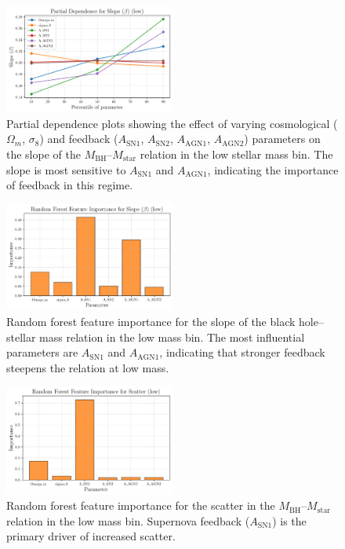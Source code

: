 \documentclass[twocolumn]{aastex631}
\begin{document}
\begin{figure}[ht!]
    \centering
    \includegraphics[width=0.5\textwidth]{plots/pdp_Slope_beta_low_29_20250423_182536.png}
    \caption{Partial dependence plots showing the effect of varying cosmological ($\Omega_m$, $\sigma_8$) and feedback ($A_\mathrm{SN1}$, $A_\mathrm{SN2}$, $A_\mathrm{AGN1}$, $A_\mathrm{AGN2}$) parameters on the slope of the $M_\mathrm{BH}$--$M_\mathrm{star}$ relation in the low stellar mass bin. The slope is most sensitive to $A_\mathrm{SN1}$ and $A_\mathrm{AGN1}$, indicating the importance of feedback in this regime.
}
    \label{fig:pdp_slope_low}
\end{figure}

\begin{figure}[ht!]
    \centering
    \includegraphics[width=0.5\textwidth]{plots/featimp_RandomForest_Slope_beta_low_27_20250423_182532.png}
    \caption{Random forest feature importance for the slope of the black hole--stellar mass relation in the low mass bin. The most influential parameters are $A_\mathrm{SN1}$ and $A_\mathrm{AGN1}$, indicating that stronger feedback steepens the relation at low mass.
}
    \label{fig:featimp_slope_low}
\end{figure}

\begin{figure}[ht!]
    \centering
    \includegraphics[width=0.5\textwidth]{plots/featimp_RandomForest_Scatter_low_33_20250423_182540.png}
    \caption{Random forest feature importance for the scatter in the $M_\mathrm{BH}$--$M_\mathrm{star}$ relation in the low mass bin. Supernova feedback ($A_\mathrm{SN1}$) is the primary driver of increased scatter.
}
    \label{fig:featimp_scatter_random_low}
\end{figure}
\end{document}

